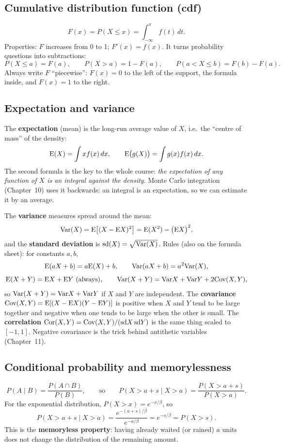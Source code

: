\subsection{Cumulative distribution function (cdf)}
\[
F(x) = P(X \le x) = \int_{-\infty}^{x} f(t)\,dt .
\]
Properties: $F$ increases from 0 to 1; $F'(x) = f(x)$. It turns probability questions into subtractions:
\[
P(X \le a) = F(a),\qquad P(X > a) = 1 - F(a),\qquad P(a < X \le b) = F(b) - F(a).
\]
Always write $F$ ``piecewise'': $F(x) = 0$ to the left of the support, the formula inside, and $F(x) = 1$ to the right.

\subsection{Expectation and variance}
The \textbf{expectation} (mean) is the long-run average value of $X$, i.e.\ the ``centre of mass'' of the density:
\[
\mathrm{E}(X) = \int x f(x)\,dx, \qquad \mathrm{E}\big(g(X)\big) = \int g(x) f(x)\,dx .
\]
The second formula is the key to the whole course: \emph{the expectation of any function of $X$ is an integral against the density}. Monte Carlo integration (Chapter~10) uses it backwards: an integral is an expectation, so we can estimate it by an average.

The \textbf{variance} measures spread around the mean:
\[
\mathrm{Var}(X) = \mathrm{E}\big[(X-\mathrm{E} X)^2\big] = \mathrm{E}(X^2) - \big(\mathrm{E} X\big)^2,
\]
and the \textbf{standard deviation} is $\mathrm{sd}(X) = \sqrt{\mathrm{Var}(X)}$.
Rules (also on the formula sheet): for constants $a,b$,
\[
\mathrm{E}(aX+b) = a\mathrm{E}(X)+b,\qquad \mathrm{Var}(aX+b) = a^2\mathrm{Var}(X),
\]
\[
\mathrm{E}(X+Y) = \mathrm{E} X + \mathrm{E} Y \text{ (always)},\qquad \mathrm{Var}(X+Y) = \mathrm{Var} X + \mathrm{Var} Y + 2\mathrm{Cov}(X,Y),
\]
so $\mathrm{Var}(X+Y) = \mathrm{Var} X + \mathrm{Var} Y$ if $X$ and $Y$ are independent.
The \textbf{covariance} $\mathrm{Cov}(X,Y) = \mathrm{E}[(X-\mathrm{E} X)(Y-\mathrm{E} Y)]$ is positive when $X$ and $Y$ tend to be large together and negative when one tends to be large when the other is small. The \textbf{correlation} $\mathrm{Cor}(X,Y) = \mathrm{Cov}(X,Y)/(\mathrm{sd}X\,\mathrm{sd}Y)$ is the same thing scaled to $[-1,1]$. Negative covariance is the trick behind antithetic variables (Chapter~11).

\subsection{Conditional probability and memorylessness}
\[
P(A \mid B) = \frac{P(A \cap B)}{P(B)}, \qquad\text{so}\qquad P(X > a+s \mid X > a) = \frac{P(X > a+s)}{P(X > a)} .
\]
For the exponential distribution, $P(X > x) = e^{-x/\beta}$, so
\[
P(X > a+s \mid X > a) = \frac{e^{-(a+s)/\beta}}{e^{-a/\beta}} = e^{-s/\beta} = P(X > s).
\]
This is the \textbf{memoryless property}: having already waited (or rained) $a$ units does not change the distribution of the remaining amount.

